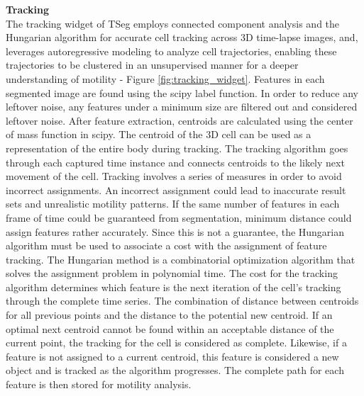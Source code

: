 \documentclass[./dissertation.tex]{subfiles}
\begin{document}
\textbf{Tracking} \\
The tracking widget of TSeg employs connected component analysis and the Hungarian algorithm for accurate cell tracking across 3D time-lapse images,  and, leverages autoregressive modeling to analyze cell trajectories, enabling these trajectories to be clustered in an unsupervised manner for a deeper understanding of motility - Figure \ref{fig:tracking_widget}. Features in each segmented image are found using the scipy label function. In order to reduce any leftover noise, any features under a minimum size are filtered out and considered leftover noise. After feature extraction, centroids are calculated using the center of mass function in scipy. The centroid of the 3D cell can be used as a representation of the entire body during tracking. The tracking algorithm goes through each captured time instance and connects centroids to the likely next movement of the cell. Tracking involves a series of measures in order to avoid incorrect assignments. An incorrect assignment could lead to inaccurate result sets and unrealistic motility patterns. If the same number of features in each frame of time could be guaranteed from segmentation, minimum distance could assign features rather accurately. Since this is not a guarantee, the Hungarian algorithm must be used to associate a cost with the assignment of feature tracking. The Hungarian method is a combinatorial optimization algorithm that solves the assignment problem in polynomial time. The cost for the tracking algorithm determines which feature is the next iteration of the cell's tracking through the complete time series. The combination of distance between centroids for all previous points and the distance to the potential new centroid. If an optimal next centroid cannot be found within an acceptable distance of the current point, the tracking for the cell is considered as complete. Likewise, if a feature is not assigned to a current centroid, this feature is considered a new object and is tracked as the algorithm progresses. The complete path for each feature is then stored for motility analysis.
\end{document}
